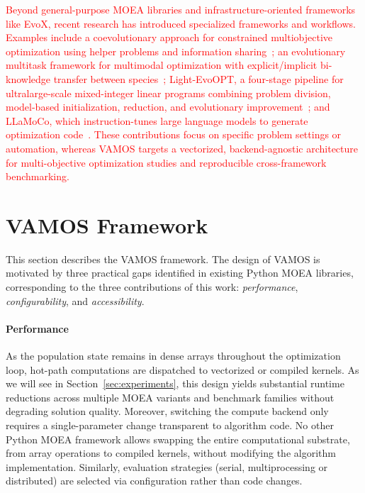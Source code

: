 \documentclass[journal]{IEEEtran}
\newcommand{\VAMOS}{VAMOS}
\begin{document}
\textcolor{red}{Beyond general-purpose MOEA libraries and infrastructure-oriented frameworks like EvoX, recent research has introduced specialized frameworks and workflows. Examples include a coevolutionary approach for constrained multiobjective optimization using helper problems and information sharing~\cite{TZX+21}; an evolutionary multitask framework for multimodal optimization with explicit/implicit bi-knowledge transfer between species~\cite{ZNL+26}; Light-EvoOPT, a four-stage pipeline for ultralarge-scale mixed-integer linear programs combining problem division, model-based initialization, reduction, and evolutionary improvement~\cite{YXC26}; and LLaMoCo, which instruction-tunes large language models to generate optimization code~\cite{MGG+26}. These contributions focus on specific problem settings or automation, whereas \VAMOS{} targets a vectorized, backend-agnostic architecture for multi-objective optimization studies and reproducible cross-framework benchmarking.}

\section{VAMOS Framework} \label{sec:framework}

This section describes the VAMOS framework. The design of VAMOS is motivated by three practical gaps identified in existing Python MOEA libraries, corresponding to the three contributions of this work: \textit{performance}, \textit{configurability}, and \textit{accessibility}.

\paragraph{Performance} As the population state remains in dense arrays throughout the optimization loop, hot-path computations are dispatched to vectorized or compiled kernels. As we will see in Section~\ref{sec:experiments}, this design yields substantial runtime reductions across multiple MOEA variants and benchmark families without degrading solution quality. Moreover, switching the compute backend only requires a single-parameter change transparent to algorithm code. No other Python MOEA framework allows swapping the entire computational substrate, from array operations to compiled kernels, without modifying the algorithm implementation. Similarly, evaluation strategies (serial, multiprocessing or distributed) are selected via configuration rather than code changes. 
\end{document}
